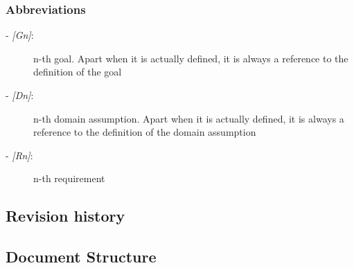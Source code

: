 	\subsubsection{Abbreviations}
		\begin{description}
			\item[- \textit{[Gn]}:] n-th goal. Apart when it is actually defined, it is always a reference to the definition of the goal
			\item[- \textit{[Dn]}:] n-th domain assumption. Apart when it is actually defined, it is always a reference to the definition of the domain assumption
			\item[- \textit{[Rn]}:] n-th requirement
		\end{description}
\subsection{Revision history}
\subsection{Document Structure}